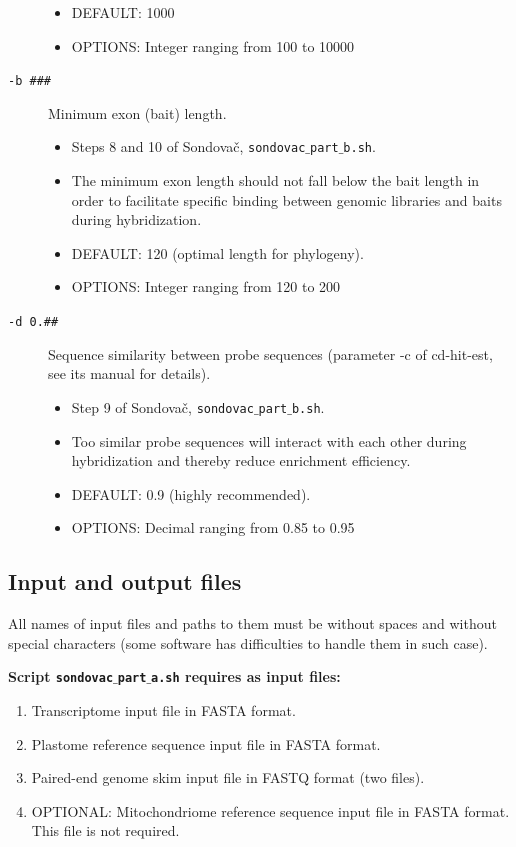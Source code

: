 \documentclass[a4paper, 11pt, twoside]{article}
\begin{document}
\begin{description}
\begin{itemize}
    \item DEFAULT: 1000
    \item OPTIONS: Integer ranging from 100 to 10000
  \end{itemize}
\item[\texttt{-b \#\#\#}] Minimum exon (bait) length.
  \begin{itemize}
    \item Steps 8 and 10 of Sondovač, \texttt{sondovac$\_$part$\_$b.sh}.
    \item The minimum exon length should not fall below the bait length in order to facilitate specific binding between genomic libraries and baits during hybridization.
    \item DEFAULT: 120 (optimal length for phylogeny).
    \item OPTIONS: Integer ranging from 120 to 200
  \end{itemize}
\item[\texttt{-d 0.\#\#}] Sequence similarity between probe sequences (parameter -c of cd-hit-est, see its manual for details).
  \begin{itemize}
    \item Step 9 of Sondovač, \texttt{sondovac$\_$part$\_$b.sh}.
    \item Too similar probe sequences will interact with each other during hybridization and thereby reduce enrichment efficiency.
    \item DEFAULT: 0.9 (highly recommended).
    \item OPTIONS: Decimal ranging from 0.85 to 0.95
  \end{itemize}
\end{description}

\subsection{Input and output files}

All names of input files and paths to them must be without spaces and without special characters (some software has difficulties to handle them in such case).

\textbf{Script \texttt{sondovac$\_$part$\_$a.sh} requires as input files:}

\begin{enumerate}
  \item Transcriptome input file in FASTA format.
  \item Plastome reference sequence input file in FASTA format.
  \item Paired-end genome skim input file in FASTQ format (two files).
  \item OPTIONAL: Mitochondriome reference sequence input file in FASTA format. This file is not required.
\end{enumerate}
\end{document}
